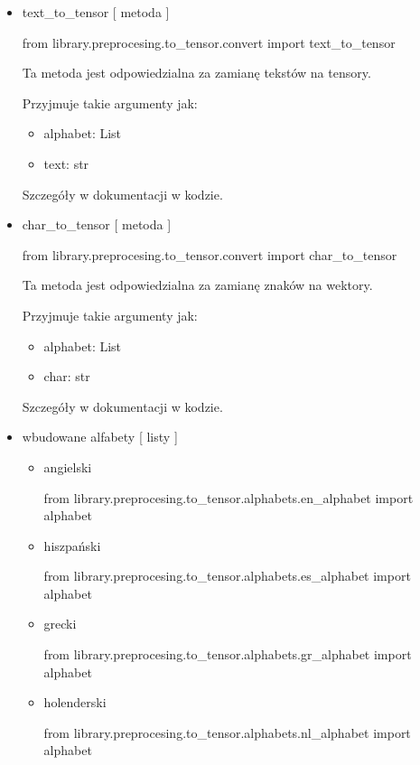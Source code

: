 \begin{itemize}

\item{text\_to\_tensor [ metoda ] }

\begin{import}
from library.preprocesing.to_tensor.convert import text_to_tensor
\end{import}
	
Ta metoda jest odpowiedzialna za zamianę tekstów na tensory.

Przyjmuje takie argumenty jak: 

\begin{itemize}
	\item alphabet: List
	\item text: str
\end{itemize}

Szczegóły w dokumentacji w kodzie.

\item{char\_to\_tensor [ metoda ] }
\begin{import}
from library.preprocesing.to_tensor.convert import char_to_tensor
\end{import}
Ta metoda jest odpowiedzialna za zamianę znaków na wektory.

Przyjmuje takie argumenty jak: 

\begin{itemize}
	\item alphabet: List
	\item char: str
\end{itemize}

Szczegóły w dokumentacji w kodzie.


\item{wbudowane alfabety [ listy ] }

\begin{itemize} 

\item angielski
\begin{import}
from library.preprocesing.to_tensor.alphabets.en_alphabet import alphabet
\end{import}


\item hiszpański
\begin{import}
from library.preprocesing.to_tensor.alphabets.es_alphabet import alphabet
\end{import}


\item grecki
\begin{import}
from library.preprocesing.to_tensor.alphabets.gr_alphabet import alphabet
\end{import}


\item holenderski
\begin{import}
from library.preprocesing.to_tensor.alphabets.nl_alphabet import alphabet
\end{import}
	
\end{itemize}

\end{itemize}


